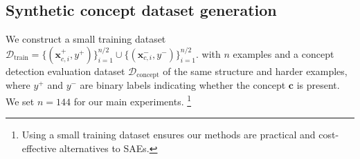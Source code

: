 \documentclass{article}
\theoremstyle{plain}
\theoremstyle{definition}
\theoremstyle{remark}
\newcommand{\shortbenchmark}{\textsc{AxBench}}
\begin{document}


\subsection{Synthetic concept dataset generation}
\label{sec:concept-dataset}
We construct a small training dataset $\mathcal{D}_\text{train} 
  = \{(\mathbf{x}_{c,i}^{+}, y^{+}) \}_{i=1}^{n/2}
    \cup 
    \{(\mathbf{x}_{c,i}^{-}, y^{-}) \}_{i=1}^{n/2}.$
with $n$ examples and a concept detection evaluation dataset $\mathcal{D}_{\text{concept}}$ of the same structure and harder examples, where $y^{+}$ and $y^{-}$ are binary labels indicating whether the concept $\mathbf{c}$ is present. We set $n=144$ for our main experiments. 
\footnote{Using a small training dataset ensures our methods are practical and cost-effective alternatives to SAEs.}
\end{document}

